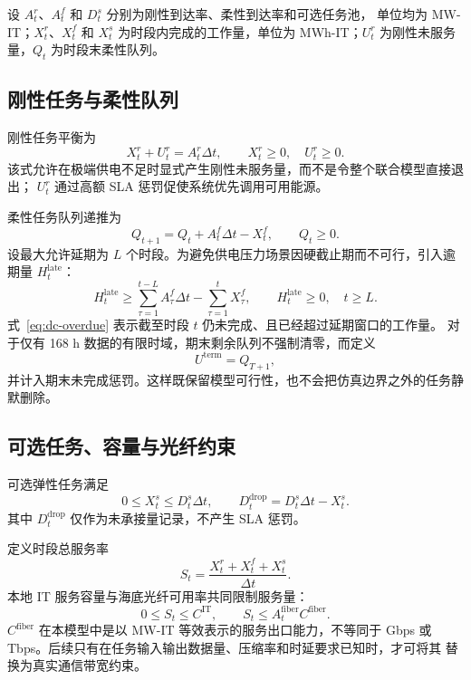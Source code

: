 设 $A_t^r$、$A_t^f$ 和 $D_t^s$ 分别为刚性到达率、柔性到达率和可选任务池，
单位均为 MW-IT；$X_t^r$、$X_t^f$ 和 $X_t^s$ 为时段内完成的工作量，单位为
MWh-IT；$U_t^r$ 为刚性未服务量，$Q_t$ 为时段末柔性队列。

\subsection{刚性任务与柔性队列}

刚性任务平衡为
\begin{equation}
X_t^r+U_t^r=A_t^r\Delta t,
\qquad X_t^r\ge0,\quad U_t^r\ge0.
\label{eq:dc-rigid}
\end{equation}
该式允许在极端供电不足时显式产生刚性未服务量，而不是令整个联合模型直接退出；
$U_t^r$ 通过高额 SLA 惩罚促使系统优先调用可用能源。

柔性任务队列递推为
\begin{equation}
Q_{t+1}=Q_t+A_t^f\Delta t-X_t^f,
\qquad Q_t\ge0.
\label{eq:dc-queue}
\end{equation}
设最大允许延期为 $L$ 个时段。为避免供电压力场景因硬截止期而不可行，引入逾期量
$H_t^{\mathrm{late}}$：
\begin{equation}
H_t^{\mathrm{late}}
\ge
\sum_{\tau=1}^{t-L}A_\tau^f\Delta t
-\sum_{\tau=1}^{t}X_\tau^f,
\qquad
H_t^{\mathrm{late}}\ge0,
\quad t\ge L.
\label{eq:dc-overdue}
\end{equation}
式~\eqref{eq:dc-overdue} 表示截至时段 $t$ 仍未完成、且已经超过延期窗口的工作量。
对于仅有 168 h 数据的有限时域，期末剩余队列不强制清零，而定义
\begin{equation}
U^{\mathrm{term}}=Q_{T+1},
\label{eq:dc-terminal}
\end{equation}
并计入期末未完成惩罚。这样既保留模型可行性，也不会把仿真边界之外的任务静默删除。

\subsection{可选任务、容量与光纤约束}

可选弹性任务满足
\begin{equation}
0\le X_t^s\le D_t^s\Delta t,
\qquad
D_t^{\mathrm{drop}}=D_t^s\Delta t-X_t^s.
\label{eq:dc-spot}
\end{equation}
其中 $D_t^{\mathrm{drop}}$ 仅作为未承接量记录，不产生 SLA 惩罚。

定义时段总服务率
\begin{equation}
S_t=\frac{X_t^r+X_t^f+X_t^s}{\Delta t}.
\label{eq:dc-service-rate}
\end{equation}
本地 IT 服务容量与海底光纤可用率共同限制服务量：
\begin{equation}
0\le S_t\le C^{\mathrm{IT}},
\qquad
S_t\le A_t^{\mathrm{fiber}}C^{\mathrm{fiber}}.
\label{eq:dc-capacity-fiber}
\end{equation}
$C^{\mathrm{fiber}}$ 在本模型中是以 MW-IT 等效表示的服务出口能力，不等同于
Gbps 或 Tbps。后续只有在任务输入输出数据量、压缩率和时延要求已知时，才可将其
替换为真实通信带宽约束。


